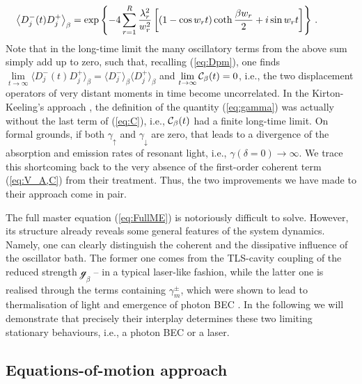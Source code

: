 \documentclass[12pt, a4paper]{iopart}
\begin{document}
%
\begin{equation}
  \label{DD}
\hspace*{-1cm}
\left\langle D_j^-(t)D_j^+\right\rangle_\beta = \exp\left\{-4\sum_{r=1}^R\frac{\lambda_r^2}{w_r^2}
\left[\left(1-\cos w_r t\right)\coth\frac{\beta w_r}{2}+i\sin w_r t\right]\right\}\, .
\end{equation}
%
Note that in the long-time limit the many oscillatory terms from the above sum simply add up to zero, such that, recalling (\ref{eq:Dpm}), one finds $\lim\limits_{t\to\infty}\langle D_j^-(t)D_j^+\rangle_\beta=\langle D_j^-\rangle_\beta\langle D_j^+\rangle_\beta$ and $\lim\limits_{t\to\infty}{\cal C}_\beta(t)=0$, i.e., the two displacement operators of very distant moments in time become uncorrelated.
In the Kirton-Keeling's approach \cite{Keeling_PRL-nonequilibrium_model_photon-cond,Keeling-Thermalization_photon_condensate}, the definition of the quantity (\ref{eq:gamma}) was actually without the last term of (\ref{eq:C}), i.e., ${\cal C}_\beta(t)$ had a finite long-time limit. On formal grounds, if both $\gamma_\uparrow$ and $\gamma_\downarrow$ are zero, that leads to a divergence of the absorption and emission rates of resonant light, i.e., $\gamma(\delta=0)\to\infty$. We trace this shortcoming back to the very absence of the first-order coherent term (\ref{eq:V_A,C}) from their treatment. Thus, the two improvements we have made to their approach come in pair.

The full master equation (\ref{eq:FullME}) is notoriously difficult to solve. However, its structure already reveals some general features of the system dynamics. Namely, one can clearly distinguish the coherent and the dissipative influence of the oscillator bath. The former one comes from the TLS-cavity coupling of the reduced strength $\mathcal{g}_\beta$ -- in a typical laser-like fashion, while the latter one is realised through the terms containing $\gamma_m^\pm$, which were shown to lead to thermalisation of light and emergence of photon BEC \cite{Keeling_PRL-nonequilibrium_model_photon-cond,Keeling-Thermalization_photon_condensate}. In the following we will demonstrate that precisely their interplay determines these two limiting stationary behaviours, i.e., a photon BEC or a laser.

\subsection{Equations-of-motion approach}
\end{document}
